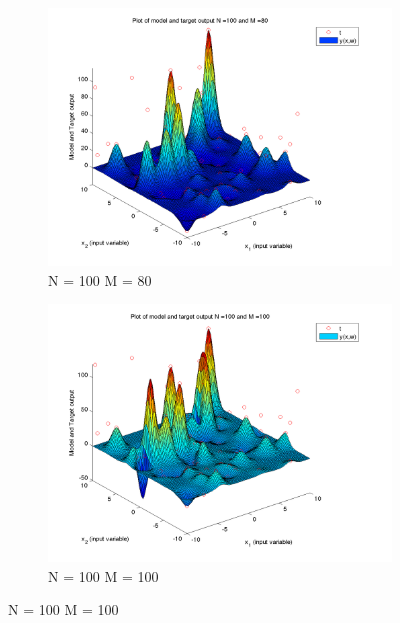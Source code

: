 \documentclass{article}
\begin{document}
\begin{figure}[H]
\begin{subfigure}{.5\textwidth}
\centering
\includegraphics[width=\linewidth]{D2/VaryingM_N100M80}
\caption{N = 100 M = 80}
\end{subfigure}
\begin{subfigure}{.5\textwidth}
\includegraphics[width=\linewidth]{D2/VaryingM_N100M100}
\caption{N = 100 M = 100}
\end{subfigure}


\end{figure}
\end{document}
